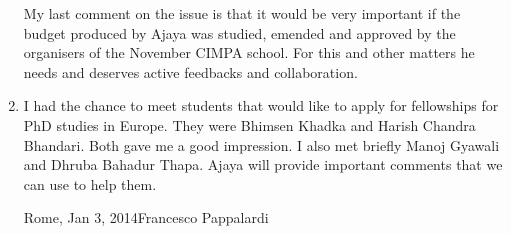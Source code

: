 \documentclass[12pt]{scrartcl}
\begin{document}
\begin{enumerate}
My last comment on the issue is that it would be very important if the budget produced by Ajaya was studied, emended and approved
by the organisers of the November CIMPA school. For this and other matters he needs and deserves active feedbacks and collaboration.

\item I had the chance to meet students that would like to apply for fellowships for PhD studies in Europe. They were Bhimsen Khadka and Harish Chandra Bhandari.
Both gave me a good impression. I also met briefly Manoj Gyawali and Dhruba Bahadur Thapa. 
Ajaya will provide important comments that we can use to help them.
\bigskip

\vfill Rome, Jan 3, 2014\hfill Francesco Pappalardi
\end{enumerate}
\end{document}
